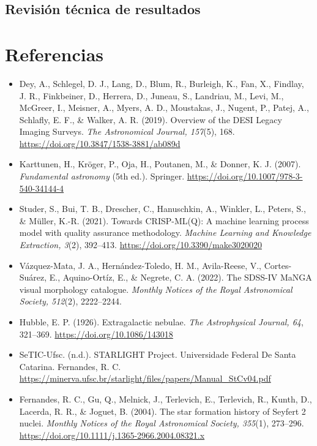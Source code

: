 \documentclass[12pt]{article}
\begin{document}
\subsection{Revisión técnica de resultados}


\clearpage
\section{Referencias}

\begin{itemize}

    \item Dey, A., Schlegel, D. J., Lang, D., Blum, R., Burleigh, K., Fan, X., Findlay, J. R., Finkbeiner, D., Herrera, D., Juneau, S., Landriau, M., Levi, M., McGreer, I., Meisner, A., Myers, A. D., Moustakas, J., Nugent, P., Patej, A., Schlafly, E. F., \& Walker, A. R. (2019). Overview of the DESI Legacy Imaging Surveys. \textit{The Astronomical Journal, 157}(5), 168. \url{https://doi.org/10.3847/1538-3881/ab089d}

    \item Karttunen, H., Kröger, P., Oja, H., Poutanen, M., \& Donner, K. J. (2007). \textit{Fundamental astronomy} (5th ed.). Springer. \url{https://doi.org/10.1007/978-3-540-34144-4}

    \item Studer, S., Bui, T. B., Drescher, C., Hanuschkin, A., Winkler, L., Peters, S., \& Müller, K.-R. (2021). Towards CRISP-ML(Q): A machine learning process model with quality assurance methodology. \textit{Machine Learning and Knowledge Extraction, 3}(2), 392--413. \url{https://doi.org/10.3390/make3020020}

    \item Vázquez-Mata, J. A., Hernández-Toledo, H. M., Avila-Reese, V., Cortes-Suárez, E., Aquino-Ortíz, E., \& Negrete, C. A. (2022). The SDSS-IV MaNGA visual morphology catalogue. \textit{Monthly Notices of the Royal Astronomical Society, 512}(2), 2222--2244.

    \item Hubble, E. P. (1926). Extragalactic nebulae. \textit{The Astrophysical Journal, 64}, 321--369. \url{https://doi.org/10.1086/143018}

    \item SeTIC-Ufsc. (n.d.). STARLIGHT Project. Universidade Federal De Santa Catarina. Fernandes, R. C. \url{https://minerva.ufsc.br/starlight/files/papers/Manual_StCv04.pdf}

    \item Fernandes, R. C., Gu, Q., Melnick, J., Terlevich, E., Terlevich, R., Kunth, D., Lacerda, R. R., \& Joguet, B. (2004). The star formation history of Seyfert 2 nuclei. \textit{Monthly Notices of the Royal Astronomical Society, 355}(1), 273–296. \url{https://doi.org/10.1111/j.1365-2966.2004.08321.x}

\end{itemize}
\end{document}
